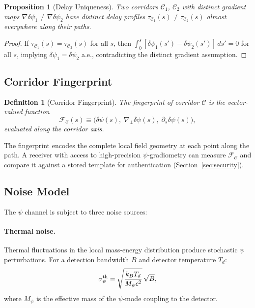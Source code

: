 \documentclass[twocolumn,superscriptaddress,prd,nofootinbib]{revtex4-2}
\newcommand{\Corridor}{\mathcal{C}}
\newcommand{\Fingerprint}{\mathcal{F}}
\newtheorem{proposition}[theorem]{Proposition}
\newtheorem{definition}{Definition}
\begin{document}
\begin{proposition}[Delay Uniqueness]
\label{prop:delay-unique}
Two corridors $\Corridor_1$, $\Corridor_2$ with distinct gradient maps
$\nabla\delta\psi_1 \neq \nabla\delta\psi_2$ have distinct delay
profiles $\tau_{\Corridor_1}(s) \neq \tau_{\Corridor_2}(s)$ almost
everywhere along their paths.
\end{proposition}

\begin{proof}
If $\tau_{\Corridor_1}(s) = \tau_{\Corridor_2}(s)$ for all $s$, then
$\int_0^s [\delta\psi_1(s') - \delta\psi_2(s')]\,ds' = 0$ for all $s$,
implying $\delta\psi_1 = \delta\psi_2$ a.e., contradicting the distinct
gradient assumption.
\end{proof}

\subsection{Corridor Fingerprint}

\begin{definition}[Corridor Fingerprint]
The fingerprint of corridor $\Corridor$ is the vector-valued function
\begin{equation}
\Fingerprint_\Corridor(s) \equiv
\bigl(\delta\psi(s),\;\nabla_\perp\delta\psi(s),\;\partial_s\delta\psi(s)\bigr),
\label{eq:fingerprint}
\end{equation}
evaluated along the corridor axis.
\end{definition}

The fingerprint encodes the complete local field geometry at each point
along the path.
A receiver with access to high-precision $\psi$-gradiometry can measure
$\Fingerprint_\Corridor$ and compare it against a stored template for
authentication (Section~\ref{sec:security}).

\subsection{Noise Model}

The $\psi$ channel is subject to three noise sources:

\paragraph{Thermal noise.}
Thermal fluctuations in the local mass-energy distribution produce
stochastic $\psi$ perturbations.
For a detection bandwidth $B$ and detector temperature $T_d$:
\begin{equation}
\sigma_\psi^{\rm th} = \sqrt{\frac{k_B T_d}{M_\psi c^2}}\,\sqrt{B},
\label{eq:thermal-noise}
\end{equation}
where $M_\psi$ is the effective mass of the $\psi$-mode coupling to the
detector.
\end{document}
